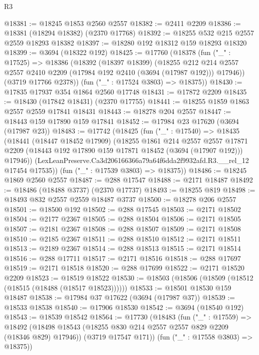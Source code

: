 \begin{lexlean}{R3}
\begin{coremodule}
@18381 := @18245 @1853 @2560 @2557
@18382 := @2411 @2209
@18386 := @18381 (@18294 @18382) (@2370 @17768)
@18392 := @18255 @532 @215 @2557 @2559 @18293 @18382
@18397 := @18280 @192 @18312 @159 @18293 @18320
@18399 := @3694 (@18322 @192)
@18425 := @17760
    (@18378
      (fun ("_" : @17525) =>
      @18386
        (@18392
          (@18397 @18399)
          (@18255
            @212
            @214
            @2557
            @2557
            @2410
            @2209
            (@17984 @192 @2410 (@3694 (@17987 @192)))
            @17946))
        (@3719 @17766 @2378))
      (fun ("_" : @17524 @3803) => @18375))
@18430 := @17835 @17937 @354 @1864 @2560 @17748
@18431 := @17872 @2209
@18435 := @18430 (@17842 @18431) (@2370 @17755)
@18441 := @18255 @1859 @1863 @2557 @2559 @17841 @18431
@18443 := @18278 @204 @2557
@18447 := @18443 @159 @17890 @159 @17841
@18452 := @17984 @23 @17620 (@3694 (@17987 @23))
@18483 := @17742
    (@18425
      (fun ("_" : @17540) =>
      @18435
        (@18441
          (@18447 @18452 @17909)
          (@18255
            @1861
            @214
            @2557
            @2557
            @17871
            @2209
            (@18443 @192 @17890 @159 @17871 @18452 (@3694 (@17907 @192)))
            @17946))
        (LexLeanPreserve.Ca3d206166366a79a64f6dda2f9932afd.R3.__rel_12 @17454 @17535))
      (fun ("_" : @17539 @3803) => @18375))
@18486 := @18245 @1869 @2560 @2557
@18487 := @288 @17547
@18488 := @2171 @18487
@18492 := @18486 (@18488 @3737) (@2370 @17737)
@18493 := @18255 @819
@18498 := @18493 @832 @2557 @2559 @18487 @3737
@18500 := @18278 @206 @2557
@18501 := @18500 @192
@18502 := @288 @17545
@18503 := @2171 @18502
@18504 := @2177 @2367
@18505 := @288 @18504
@18506 := @2171 @18505
@18507 := @2181 @2367
@18508 := @288 @18507
@18509 := @2171 @18508
@18510 := @2185 @2367
@18511 := @288 @18510
@18512 := @2171 @18511
@18513 := @2189 @2367
@18514 := @288 @18513
@18515 := @2171 @18514
@18516 := @288 @17711
@18517 := @2171 @18516
@18518 := @288 @17697
@18519 := @2171 @18518
@18520 := @288 @17699
@18522 := @2171 @18520 @2209
@18523 := @18519 @18522
@18530 := @18503 (@18506 (@18509 (@18512 (@18515 (@18488 (@18517 @18523))))))
@18533 := @18501 @18530 @159 @18487
@18538 := @17984 @37 @17622 (@3694 (@17987 @37))
@18539 := @18533 @18538
@18540 := @17906 @18530
@18542 := @3694 (@18540 @192)
@18543 := @18539 @18542
@18564 := @17730
    (@18483
      (fun ("_" : @17559) =>
      @18492
        (@18498 @18543 (@18255 @830 @214 @2557 @2557 @829 @2209 (@18346 @829) @17946))
        (@3719 @17547 @171))
      (fun ("_" : @17558 @3803) => @18375))

\end{coremodule}
\end{lexlean}
